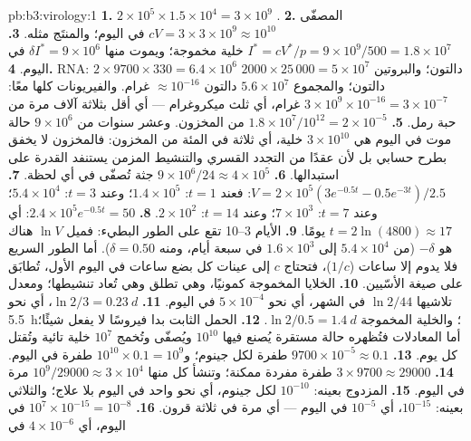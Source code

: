\begin{solution}{pb:b3:virology:1}
\textbf{1.} $2\times 10^{5}\times 1.5\times 10^{4} = 3\times 10^{9}$
.
\textbf{2.} المصفّى $cV = 3\times 3\times 10^{9} \approx 10^{10}$ في اليوم؛
والمنتَج مثله.
\textbf{3.} $I^{*} = cV^{*}/p = 9\times 10^{9}/500 = 1.8\times 10^{7}$
خلية مخموجة؛ ويموت منها $\delta I^{*} = 9\times 10^{6}$ في اليوم.
\textbf{4.} RNA: $2\times 9700\times 330 = 6.4\times 10^{6}$ دالتون؛ والبروتين
$2000\times 25\,000 = 5\times 10^{7}$ دالتون؛ والمجموع $5.6\times 10^{7}$ دالتون
$\approx 10^{-16}$ غرام. والفيريونات كلها معًا: $3\times 10^{9}\times
10^{-16} = 3\times 10^{-7}$ غرام، أي ثلث ميكروغرام --- أي أقل بثلاثة
آلاف مرة من حبة رمل.
\textbf{5.} $1.8\times 10^{7}/10^{12} = 2\times 10^{-5}$ من المخزون.
وعشر سنوات من $9\times 10^{6}$ حالة موت في اليوم هي $3\times 10^{10}$ خلية،
أي ثلاثة في المئة من المخزون: فالمخزون لا يخفق بطرح
حسابي بل لأن عقدًا من التجدد القسري والتنشيط
المزمن يستنفد القدرة على استبدالها.
\textbf{6.} $9\times 10^{6}/24 \approx 4\times 10^{5}$ جثة تُصفّى
في أي لحظة.
\textbf{7.} $V = 2\times 10^{5}(3e^{-0.5t} - 0.5e^{-3t})/2.5$: فعند $t = 1$:
$1.4\times 10^{5}$؛ وعند $t = 3$: $5.4\times 10^{4}$؛ وعند $t = 7$: $7\times
10^{3}$؛ وعند $t = 14$: $2\times 10^{2}$.
\textbf{8.} $2.4\times 10^{5}e^{-0.5t} = 50$: أي $t = 2\ln(4800) \approx 17$
يومًا.
\textbf{9.} الأيام 3--10 تقع على الطور البطيء: فميل $\ln V$ هناك هو
$-\delta$ (من $5.4\times 10^{4}$ إلى $1.6\times 10^{3}$ في سبعة أيام،
ومنه $\delta = 0.50$). أما الطور السريع فلا يدوم إلا ساعات ($1/c$)، فتحتاج $c$ إلى
عينات كل بضع ساعات في اليوم الأول، تُطابَق على صيغة الأسّيين.
\textbf{10.} الخلايا المخموجة كمونيًا، وهي تطلق  وهي
تُعاد تنشيطها؛ ومعدل تلاشيها $\ln 2/44$ في الشهر، أي نحو
$5\times 10^{-4}$ في اليوم.
\textbf{11.}  $\ln 2/3 = \qty{0.23}{d}$، أي نحو \qty{5.5}{h}؛ والخلية
المخموجة $\ln 2/0.5 = \qty{1.4}{d}$.
\textbf{12.} الحمل الثابت بدا فيروسًا لا يفعل شيئًا؛ أما
المعادلات فتُظهره حالة مستقرة يُصنع فيها $10^{10}$ 
ويُصفّى وتُخمج $10^{7}$ خلية تائية وتُقتل كل يوم.
\textbf{13.} $9700\times 10^{-5} \approx 0.1$ طفرة لكل جينوم؛
و$10^{10}\times 0.1 = 10^{9}$ طفرة في اليوم.
\textbf{14.} $3\times 9700 \approx \num{29000}$ طفرة مفردة ممكنة؛
وتنشأ كل منها $10^{9}/\num{29000} \approx 3\times 10^{4}$ مرة في اليوم.
\textbf{15.} المزدوج بعينه: $10^{-10}$ لكل جينوم، أي نحو واحد في اليوم
بلا علاج؛ والثلاثي بعينه: $10^{-15}$، أي $10^{-5}$ في اليوم --- أي مرة في
ثلاثة قرون.
\textbf{16.} $10^{7}\times 10^{-15} = 10^{-8}$ في اليوم، أي $4\times 10^{-6}$ في

\end{solution}

